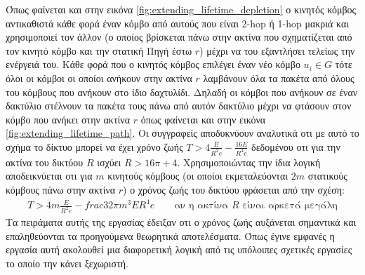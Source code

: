 Όπως φαίνεται και στην εικόνα \ref{fig:extending_lifetime_depletion} ο κινητός κόμβος αντικαθιστά κάθε φορά έναν κόμβο από αυτούς που είναι 2-hop ή 1-hop μακριά και
χρησιμοποιεί τον άλλον (ο οποίος βρίσκεται πάνω στην ακτίνα που σχηματίζεται από τον κινητό κόμβο και την στατική Πηγή έστω $r$) μέχρι να του εξαντλήσει τελείως την
ενέργειά του. Κάθε φορά που ο κινητός κόμβος επιλέγει έναν νέο κόμβο $u_{i}\in G$ τότε όλοι οι κόμβοι οι οποίοι ανήκουν στην ακτίνα $r$ λαμβάνουν όλα τα πακέτα από
όλους του κόμβους που ανήκουν στο ίδιο δαχτυλίδι. Δηλαδή οι κόμβοι που ανήκουν σε έναν δακτύλιο στέλνουν τα πακέτα τους πάνω από αυτόν δακτύλιο μέχρι να φτάσουν στον
κόμβο που ανήκει στην ακτίνα $r$ όπως φαίνεται και στην εικόνα \ref{fig:extending_lifetime_path}. Οι συγγραφείς αποδυκνύουν αναλυτικά οτι με αυτό το σχήμα το δίκτυο
μπορεί να έχει χρόνο ζωής  $T>4\frac{E}{R^{2}e}-\frac{16E}{R^{4}e}$ δεδομένου οτι για την ακτίνα του δικτύου $R$ ισχύει $R>16\pi+4$. Χρησιμοποιώντας την ίδια λογική
αποδεικνύεται οτι για $m$ κινητούς κόμβους (οι οποίοι εκμεταλεύονται $2m$ στατικούς κόμβους πάνω στην ακτίνα $r$) ο χρόνος ζωής του δικτύου φράσεται από την σχέση:
\begin{align*}
T>4m\frac{E}{R^{2}e}-frac{32\pi m^{3}E}{R^{4}e} \qquad\text{αν η ακτίνα $R$ είναι αρκετά μεγάλη}
\end{align*}
Τα πειράματα αυτής της εργασίας έδειξαν οτι ο χρόνος ζωής αυξάνεται σημαντικά και επαληθεύονται τα προηγούμενα θεωρητικά αποτελέσματα. Όπως έγινε εμφανές η εργασία
αυτή ακολουθεί μια διαφορετική λογική από τις υπόλοιπες σχετικές εργασίες το οποίο την κάνει ξεχωριστή.

